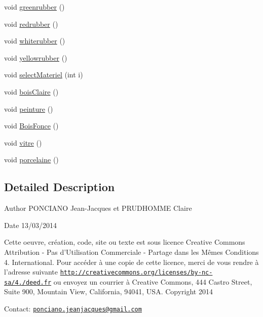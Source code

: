 \begin{DoxyCompactItemize}
\item 
void \hyperlink{classMateriel_aaac30424a4c261bbabe99aa347988d81}{greenrubber} ()
\item 
void \hyperlink{classMateriel_ac730b39c254bc960a16f19e8f3722493}{redrubber} ()
\item 
void \hyperlink{classMateriel_a1c24aeb97eaa17553dfdb5933b2e64b6}{whiterubber} ()
\item 
void \hyperlink{classMateriel_ad528d3c44f5c517858d1dad0ecc7c834}{yellowrubber} ()
\item 
void \hyperlink{classMateriel_a0ad6369d4295b250ef2842b0b8f32668}{select\-Materiel} (int i)
\item 
void \hyperlink{classMateriel_a24cd089e317e0f1fa4e5f6ad9484d56c}{bois\-Claire} ()
\item 
void \hyperlink{classMateriel_a3f4e98359e1053457b5968f2d912de86}{peinture} ()
\item 
void \hyperlink{classMateriel_a8c0defabc9974f1801dfc82236d751ac}{Bois\-Fonce} ()
\item 
void \hyperlink{classMateriel_af61a650d8ff44c710f3258ab15bbf4f1}{vitre} ()
\item 
void \hyperlink{classMateriel_afa2f1d85a1980a94a3b58e1bdd7f81b3}{porcelaine} ()
\end{DoxyCompactItemize}


\subsection{Detailed Description}
\begin{DoxyAuthor}{Author}
P\-O\-N\-C\-I\-A\-N\-O Jean-\/\-Jacques et P\-R\-U\-D\-H\-O\-M\-M\-E Claire 
\end{DoxyAuthor}
\begin{DoxyDate}{Date}
13/03/2014
\end{DoxyDate}
Cette oeuvre, création, code, site ou texte est sous licence Creative Commons Attribution -\/ Pas d’\-Utilisation Commerciale -\/ Partage dans les Mêmes Conditions 4. International. Pour accéder à une copie de cette licence, merci de vous rendre à l'adresse suivante \href{http://creativecommons.org/licenses/by-nc-sa/4.0/deed.fr}{\tt http\-://creativecommons.\-org/licenses/by-\/nc-\/sa/4./deed.\-fr} ou envoyez un courrier à Creative Commons, 444 Castro Street, Suite 900, Mountain View, California, 94041, U\-S\-A. Copyright 2014

Contact\-: \href{mailto:ponciano.jeanjacques@gmail.com}{\tt ponciano.\-jeanjacques@gmail.\-com} 

